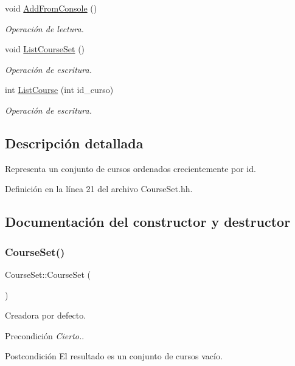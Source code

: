 \begin{DoxyCompactItemize}
void \mbox{\hyperlink{class_course_set_aee9d2b96c43a828049e02205736a4982}{Add\+From\+Console}} ()
\begin{DoxyCompactList}\small\item\em Operación de lectura. \end{DoxyCompactList}\item 
void \mbox{\hyperlink{class_course_set_a31726d4dcdefc4a218f9e1466fd2ef38}{List\+Course\+Set}} ()
\begin{DoxyCompactList}\small\item\em Operación de escritura. \end{DoxyCompactList}\item 
int \mbox{\hyperlink{class_course_set_aee3609cbaa62ae2be155754613d484e3}{List\+Course}} (int id\+\_\+curso)
\begin{DoxyCompactList}\small\item\em Operación de escritura. \end{DoxyCompactList}\end{DoxyCompactItemize}


\subsection{Descripción detallada}
Representa un conjunto de cursos ordenados crecientemente por id. 

Definición en la línea 21 del archivo Course\+Set.\+hh.



\subsection{Documentación del constructor y destructor}
\mbox{\label{class_course_set_ae0b73bd2e6bda115838ba65644e015bc}} 
\subsubsection{\texorpdfstring{Course\+Set()}{CourseSet()}}
{\footnotesize\ttfamily Course\+Set\+::\+Course\+Set (\begin{DoxyParamCaption}{ }\end{DoxyParamCaption})}



Creadora por defecto. 

\begin{DoxyPrecond}{Precondición}
{\itshape Cierto.}. 
\end{DoxyPrecond}
\begin{DoxyPostcond}{Postcondición}
El resultado es un conjunto de cursos vacío. 
\end{DoxyPostcond}


